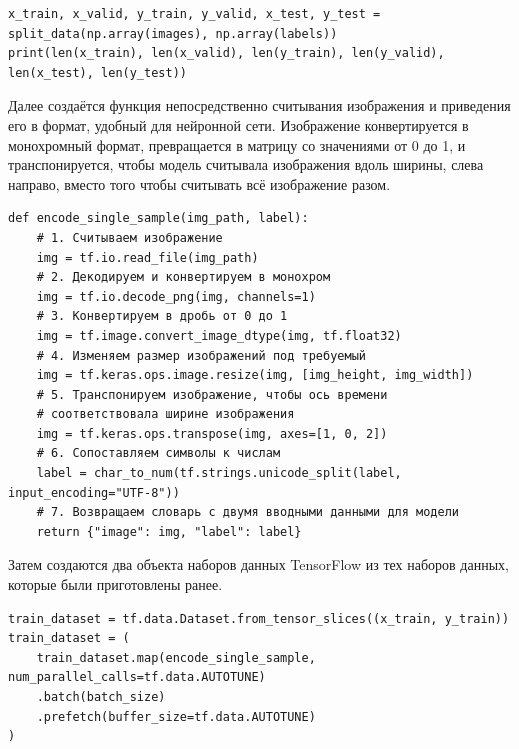 \documentclass[../document.tex]{subfiles}
\begin{document}
\begin{enumerate}
\begin{verbatim}
x_train, x_valid, y_train, y_valid, x_test, y_test = split_data(np.array(images), np.array(labels))
print(len(x_train), len(x_valid), len(y_train), len(y_valid), len(x_test), len(y_test))
\end{verbatim}
\par Далее создаётся функция непосредственно считывания изображения и приведения его в формат, удобный для нейронной сети. Изображение конвертируется в монохромный формат, превращается в матрицу со значениями от 0 до 1, и транспонируется, чтобы модель считывала изображения вдоль ширины, слева направо, вместо того чтобы считывать всё изображение разом.
\begin{verbatim}
def encode_single_sample(img_path, label):
    # 1. Считываем изображение
    img = tf.io.read_file(img_path)
    # 2. Декодируем и конвертируем в монохром
    img = tf.io.decode_png(img, channels=1)
    # 3. Конвертируем в дробь от 0 до 1
    img = tf.image.convert_image_dtype(img, tf.float32)
    # 4. Изменяем размер изображений под требуемый
    img = tf.keras.ops.image.resize(img, [img_height, img_width])
    # 5. Транспонируем изображение, чтобы ось времени
    # соответствовала ширине изображения
    img = tf.keras.ops.transpose(img, axes=[1, 0, 2])
    # 6. Сопоставляем символы к числам
    label = char_to_num(tf.strings.unicode_split(label, input_encoding="UTF-8"))
    # 7. Возвращаем словарь с двумя вводными данными для модели
    return {"image": img, "label": label}
\end{verbatim}
\par Затем создаются два объекта наборов данных TensorFlow из тех наборов данных, которые были приготовлены ранее.
\begin{verbatim}
train_dataset = tf.data.Dataset.from_tensor_slices((x_train, y_train))
train_dataset = (
    train_dataset.map(encode_single_sample, num_parallel_calls=tf.data.AUTOTUNE)
    .batch(batch_size)
    .prefetch(buffer_size=tf.data.AUTOTUNE)
)


\end{verbatim}
\end{enumerate}
\end{document}
